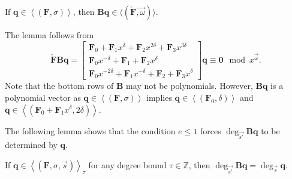\begin{lem}
\label{lem:qToBqOrder}If $\mathbf{q}\in\left\langle \left(\mathbf{F},\sigma\right)\right\rangle $,
then $\mathbf{B}\mathbf{q}\in\langle(\check{\mathbf{F}}\vec{,\omega})\rangle$.\end{lem}
\begin{pf}
The lemma follows from \[
\check{\mathbf{F}}\mathbf{B}\mathbf{q}=\left[\begin{array}{r}
\mathbf{F}_{0}+\mathbf{F}_{1}x^{\delta}+\mathbf{F}_{2}x^{2\delta}+\mathbf{F}_{3}x^{3\delta}\\
\mathbf{F}_{0}x^{-\delta}+\mathbf{F}_{1}+\mathbf{F}_{2}x^{\delta}\\
\mathbf{F}_{0}x^{-2\delta}+\mathbf{F}_{1}x^{-\delta}+\mathbf{F}_{2}+\mathbf{F}_{3}x^{\delta}\end{array}\right]\mathbf{q}\equiv\mathbf{0}\mod x^{\vec{\omega}}.\]
 Note that the bottom rows of $\mathbf{B}$ may not be polynomials.
However, $\mathbf{B}\mathbf{q}$ is a polynomial vector as $\mathbf{q}\in\left\langle \left(\mathbf{F},\sigma\right)\right\rangle $
implies $\mathbf{q}\in\left\langle \left(\mathbf{F}_{0},\delta\right)\right\rangle $
and $\mathbf{q}\in\left\langle \left(\mathbf{F}_{0}+\mathbf{F}_{1}x^{\delta},2\delta\right)\right\rangle $. 
\end{pf}
\noindent The following lemma shows that the condition $e\le1$ forces
$\deg_{\vec{s'}}\mathbf{B}\mathbf{q}$ to be determined by $\mathbf{q}$. 
\begin{lem}
\label{lem:qToBqDegree}If $\mathbf{q}\in\left\langle \left(\mathbf{F},\sigma,\vec{s}\right)\right\rangle _{\tau}$
\textup{for any degree bound $\tau\in\mathbb{Z}$}, then $\deg_{\vec{s'}}\mathbf{B}\mathbf{q}=\deg_{\vec{s}}\mathbf{q}$.\end{lem}
